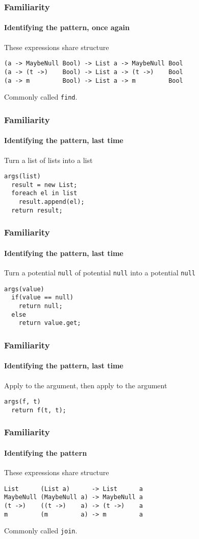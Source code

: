 \begin{frame}[fragile]
\frametitle{Familiarity}
\framesubtitle{Identifying the pattern, once again}
\begin{block}{These expressions share structure}
\begin{lstlisting}[style=language]
(a -> MaybeNull Bool) -> List a -> MaybeNull Bool
(a -> (t ->)    Bool) -> List a -> (t ->)    Bool
(a -> m         Bool) -> List a -> m         Bool
\end{lstlisting}
\end{block}
Commonly called \lstinline{find}.
\end{frame}

\begin{frame}[fragile]
\frametitle{Familiarity}
\framesubtitle{Identifying the pattern, last time}
\begin{block}{Turn a list of lists into a list}
\begin{lstlisting}[style=language]
args(list)
  result = new List;
  foreach el in list
    result.append(el);
  return result;
\end{lstlisting}
\end{block}
\end{frame}

\begin{frame}[fragile]
\frametitle{Familiarity}
\framesubtitle{Identifying the pattern, last time}
\begin{block}{Turn a potential \lstinline{null} of potential \lstinline{null} into a potential \lstinline{null}}
\begin{lstlisting}[style=language]
args(value)
  if(value == null)
    return null;
  else
    return value.get;
\end{lstlisting}
\end{block}
\end{frame}

\begin{frame}[fragile]
\frametitle{Familiarity}
\framesubtitle{Identifying the pattern, last time}
\begin{block}{Apply to the argument, then apply to the argument}
\begin{lstlisting}[style=language]
args(f, t)
  return f(t, t);
\end{lstlisting}
\end{block}
\end{frame}

\begin{frame}[fragile]
\frametitle{Familiarity}
\framesubtitle{Identifying the pattern}
\begin{block}{These expressions share structure}
\begin{lstlisting}[style=language]
List      (List a)      -> List      a
MaybeNull (MaybeNull a) -> MaybeNull a
(t ->)    ((t ->)    a) -> (t ->)    a
m         (m         a) -> m         a
\end{lstlisting}
\end{block}
Commonly called \lstinline{join}.
\end{frame}
